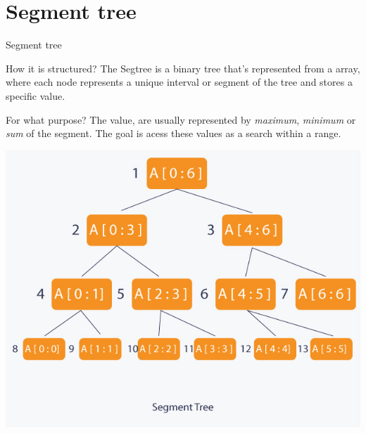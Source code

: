 \documentclass[presentation,12pt]{beamer}
\begin{document}
\section{Segment tree}
\label{sec:org4060469}
\begin{frame}[label={sec:org2b8c3d6}]{Segment tree}
\begin{block}{How it is structured?}
The Segtree is a binary tree that's represented from a array, where each node represents a unique interval or segment of the tree and stores a \alert{specific} value. 
\end{block}
\begin{block}{For what purpose?}
The value, are usually represented by \emph{maximum}, \emph{minimum} or \emph{sum} of the segment. The goal is acess these values as a search within a range.
\end{block}
\end{frame}
\begin{frame}[label={sec:org9dacd48}]{}
\begin{center}
\includegraphics[width=.9\linewidth]{./img/segtree.jpg}
\end{center}
\end{frame}
\begin{frame}[label={sec:org7f7c3f7}]{}
\end{frame}
\end{document}
